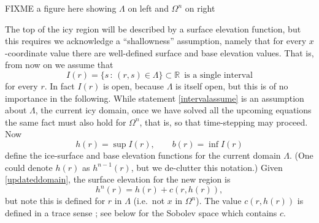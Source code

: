 \documentclass[letterpaper,final,12pt,reqno]{amsart}
\newcommand{\RR}{\mathbb{R}}
\begin{document}
FIXME a figure here showing $\Lambda$ on left and $\Omega^n$ on right

The top of the icy region will be described by a surface elevation function, but this requires we acknowledge a ``shallowness'' assumption, namely that for every $x$-coordinate value there are well-defined surface and base elevation values.  That is, from now on we assume that
\begin{equation}
I(r) = \{s\,:\,(r,s) \in \Lambda\} \subset \RR \, \text{ is a single interval}\label{intervalassume}
\end{equation}
for every $r$.  In fact $I(r)$ is open, because $\Lambda$ is itself open, but this is of no importance in the following.  While statement \eqref{intervalassume} is an assumption about $\Lambda$, the current icy domain, once we have solved all the upcoming equations the same fact must also hold for $\Omega^n$, that is, so that time-stepping may proceed.  Now
    $$h(r) = \sup I(r), \qquad b(r) = \inf I(r)$$
define the ice-surface and base elevation functions for the current domain $\Lambda$.  (One could denote $h(r)$ as $h^{n-1}(r)$, but we de-clutter this notation.)  Given \eqref{updateddomain}, the surface elevation for the new region is
\begin{equation}
h^n(r) = h(r) + c(r,h(r)),  \label{newsurfaceelevation}
\end{equation}
but note this is defined for $r$ in $\Lambda$ (i.e.~not $x$ in $\Omega^n$).  The value $c(r,h(r))$ is defined in a trace sense \cite{Evans2010}; see below for the Sobolev space which contains $c$.
\end{document}
